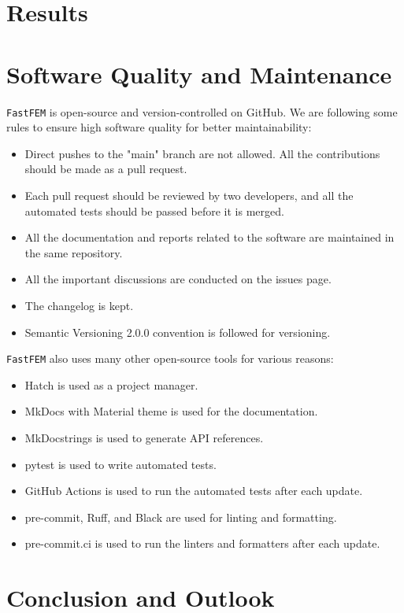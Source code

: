 \documentclass[headings=standardclasses, abstract=true]{scrartcl}
\begin{document}
\section{Results}

\section{Software Quality and Maintenance}

\texttt{FastFEM} is open-source and version-controlled on GitHub\supercite{fastfem}. We are following some rules to ensure high software quality for better maintainability:

\begin{itemize}
    \item Direct pushes to the "main" branch are not allowed. All the contributions should be made as a pull request.
    \item Each pull request should be reviewed by two developers, and all the automated tests should be passed before it is merged.
    \item All the documentation and reports related to the software are maintained in the same repository.
    \item All the important discussions are conducted on the issues page.
    \item The changelog is kept.
    \item Semantic Versioning 2.0.0\supercite{semanticVersioning} convention is followed for versioning.
\end{itemize}

\texttt{FastFEM} also uses many other open-source tools for various reasons:
\begin{itemize}
    \item Hatch\supercite{hatch} is used as a project manager.
    \item MkDocs\supercite{mkdocs} with Material theme\supercite{mkdocsmaterial} is used for the documentation.
    \item MkDocstrings\supercite{mkdocstrings} is used to generate API references.
    \item pytest\supercite{pytest} is used to write automated tests.
    \item GitHub Actions\supercite{githubactions} is used to run the automated tests after each update.
    \item pre-commit\supercite{precommit}, Ruff\supercite{ruff}, and Black\supercite{black} are used for linting and formatting.
    \item pre-commit.ci is used to run the linters and formatters after each update.
\end{itemize}


\section{Conclusion and Outlook}

\clearpage
\printbibliography
\end{document}
